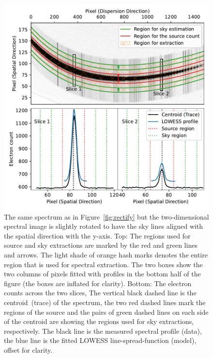 \documentclass[twocolumn, linenumbers]{aastex631}
\begin{document}
\begin{figure}
    \centering
    \includegraphics[width=\columnwidth]{fig_03_extraction_profile.pdf}
    \caption{The same spectrum as in Figure~\ref{fig:rectify} but the
    two-dimensional spectral image is slightly rotated to have the sky lines
    aligned with the spatial direction with the y-axis.
    Top: The regions used for source and sky extractions are marked
    by the red and green lines and arrows. The light shade of orange
    hash marks denotes the entire region that is used for spectral extraction.
    The two boxes show the two columns of pixels fitted with
    profiles in the bottom half of the figure (the boxes are inflated
    for clarity). Bottom: The electron counts across the two slices,
    The vertical black dashed line is the centroid~(trace) of the spectrum,
    the two red dashed lines mark the regions of the source and the
    pairs of green dashed lines on each side of the centroid are
    showing the regions used for sky extractions, respectively. The
    black line is the measured spectral profile (data), the blue
    line is the fitted LOWESS line-spread-function (model), offset for
    clarity.}
    \label{fig:extraction}
\end{figure}

\end{document}
